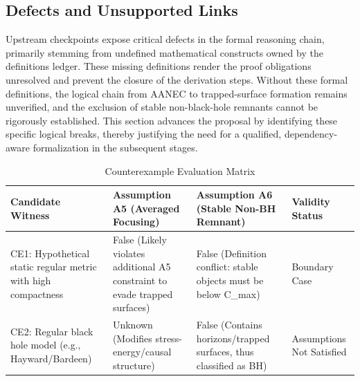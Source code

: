 \documentclass[conference]{IEEEtran}
\begin{document}
\subsection{Defects and Unsupported Links}
Upstream checkpoints expose critical defects in the formal reasoning chain, primarily stemming from undefined mathematical constructs owned by the definitions ledger. These missing definitions render the proof obligations unresolved and prevent the closure of the derivation steps. Without these formal definitions, the logical chain from AANEC to trapped-surface formation remains unverified, and the exclusion of stable non-black-hole remnants cannot be rigorously established. This section advances the proposal by identifying these specific logical breaks, thereby justifying the need for a qualified, dependency-aware formalization in the subsequent stages.

\begin{table}[htbp]
\centering
\footnotesize
\setlength{\tabcolsep}{3pt}
\renewcommand{\arraystretch}{1.12}
\caption{Counterexample Evaluation Matrix}
\label{tab:idea-origin-and-selection-block-3}
\begin{tabular}{|p{}|p{}|p{}|p{}|}
\hline
Candidate Witness & Assumption A5 (Averaged Focusing) & Assumption A6 (Stable Non-BH Remnant) & Validity Status \\\hline
CE1: Hypothetical static regular metric with high compactness & False (Likely violates additional A5 constraint to evade trapped surfaces) & False (Definition conflict: stable objects must be below C\_max) & Boundary Case \\\hline
CE2: Regular black hole model (e.g., Hayward/Bardeen) & Unknown (Modifies stress-energy/causal structure) & False (Contains horizons/trapped surfaces, thus classified as BH) & Assumptions Not Satisfied \\\hline
\end{tabular}
\end{table}
\end{document}
